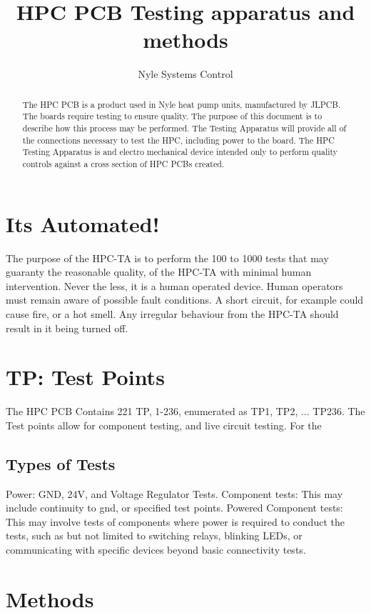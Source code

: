 \documentclass[]{article}
\title{HPC PCB Testing apparatus and methods}
\author{Nyle Systems Control}
\begin{document}
\maketitle

\begin{abstract}
The HPC PCB is a product used in Nyle heat pump units, manufactured by JLPCB. The boards require testing to ensure quality. The purpose of this document is to describe how this process may be performed.
The Testing Apparatus will provide all of the connections necessary to test the HPC, including power to the board. The HPC Testing Apparatus is and electro mechanical device intended only to perform quality controls against a cross section of HPC PCBs created. 
\end{abstract}

\section*{Its Automated!}
The purpose of the HPC-TA  is to perform the 100 to 1000 tests that may guaranty the reasonable quality, of the HPC-TA with minimal human intervention. Never the less, it is a human operated device. Human operators must remain aware of possible fault conditions. A short circuit, for example could cause fire, or a hot smell. Any irregular behaviour from the HPC-TA should result in it being turned off. 

\section*{TP: Test Points}
The HPC PCB Contains 221 TP, 1-236, enumerated as TP1, TP2, ... TP236. The Test points allow for component testing, and live circuit testing. For the 
\subsection*{Types of Tests}
Power: GND, 24V, and Voltage Regulator Tests. 
Component tests: This may include continuity to gnd, or specified test points.
Powered Component tests: This may involve tests of components where power is required to conduct the tests, such as but not limited to switching relays, blinking LEDs, or communicating with specific devices beyond basic connectivity tests. 

\section*{Methods}

\section*{}
\section*{}
\section*{}
\end{document}
